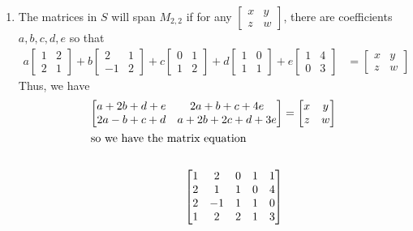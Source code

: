 \begin{enumerate}
\item
The matrices in $S$ will span $M_{2,2}$ if for any $\begin{bmatrix} x& y\\z& w\end{bmatrix}$, there are coefficients $a, b, c, d, e$ so that 
%
\begin{align*}
a\begin{bmatrix} 1 & 2\\ 2 & 1 \end{bmatrix} + 
b\begin{bmatrix} 2 & 1\\-1 & 2 \end{bmatrix} + 
c\begin{bmatrix} 0 & 1 \\ 1 & 2\end{bmatrix} + 
d\begin{bmatrix} 1 & 0 \\ 1 & 1\end{bmatrix} + 
e\begin{bmatrix} 1 & 4 \\ 0 & 3 \end{bmatrix} 
&= 
\begin{bmatrix} x & y \\ z & w \end{bmatrix}
\end{align*}
%
Thus, we have 
%
\begin{align*}
\begin{bmatrix} 
a + 2b + d + e & 2a + b + c + 4e\\ 
2a - b + c + d& a + 2b + 2c + d + 3e
\end{bmatrix} 
&=
\begin{bmatrix} 
x & y \\
 z & w 
\end{bmatrix}\\
\intertext{so we have  the matrix equation}\\
\begin{bmatrix} 
1 & 2 & 0 & 1 & 1 \\ 
2 & 1 & 1 & 0 & 4\\ 
2 & -1 & 1 & 1 & 0\\ 
1 & 2 & 2 & 1 & 3 
\end{bmatrix}

\end{align*}
\end{enumerate}
